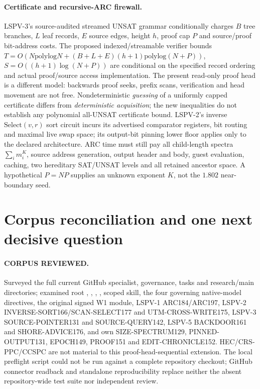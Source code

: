 \documentclass[11pt]{article}
\begin{document}
\paragraph{Certificate and recursive-ARC firewall.} LSPV-3's source-audited streamed UNSAT grammar conditionally charges $B$ tree branches, $L$ leaf records, $E$ source edges, height $h$, proof cap $P$ and source/proof bit-address costs. The proposed indexed/streamable verifier bounds $T=O(N\mathrm{polylog}N+(B+L+E)(h+1)\mathrm{polylog}(N+P))$, $S=O((h+1)\log(N+P))$ are conditional on the specified record ordering and actual proof/source access implementation. The present read-only proof head is a different model: backwards proof seeks, prefix scans, verification and head movement are not free. Nondeterministic \emph{guessing} of a uniformly capped certificate differs from \emph{deterministic acquisition}; the new inequalities do not establish any polynomial all-UNSAT certificate bound. LSPV-2's inverse $\mathrm{Select}(v,r)$ sort circuit incurs its advertised comparator registers, bit routing and maximal live swap space; its output-bit pinning lower floor applies only to the declared architecture. ARC time must still pay all child-length spectra $\sum_i m_i^K$, source address generation, output header and body, guest evaluation, caching, two hereditary SAT/UNSAT levels and all retained ancestor space. A hypothetical $P=NP$ supplies an unknown exponent $K$, not the $1.802$ near-boundary seed.

\section{Corpus reconciliation and one next decisive question}
\paragraph{CORPUS REVIEWED.} Surveyed the full current GitHub specialist, governance, tasks and research/main directories; examined root , , , , scoped  skill, the four governing native-model directives, the original signed W1 module, LSPV-1 ARC184/ARC197, LSPV-2 INVERSE-SORT166/SCAN-SELECT177 and UTM-CROSS-WRITE175, LSPV-3 SOURCE-POINTER131 and SOURCE-QUERY142, LSPV-5 BACKDOOR161 and SHORE-ADVICE176, and own SIZE-SPECTRUM129, PINNED-OUTPUT131, EPOCH149, PROOF151 and EDIT-CHRONICLE152. HEC/CRS-PPC/CCSPC are not material to this proof-head-sequential extension. The local preflight script could not be run against a complete repository checkout; GitHub connector readback and standalone reproducibility replace neither the absent repository-wide test suite nor independent review.
\end{document}
